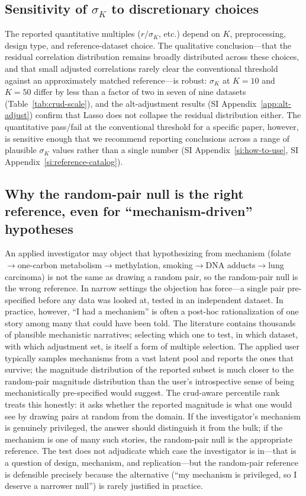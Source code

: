 \subsection{Sensitivity of \texorpdfstring{$\sigma_K$}{sigma\_K} to discretionary choices}
\label{si:sigma-K-sensitivity}

The reported quantitative multiples ($r/\sigma_K$, etc.) depend on $K$, preprocessing, design type, and reference-dataset choice. The qualitative conclusion---that the residual correlation distribution remains broadly distributed across these choices, and that small adjusted correlations rarely clear the conventional threshold against an approximately matched reference---is robust: $\sigma_K$ at $K=10$ and $K=50$ differ by less than a factor of two in seven of nine datasets (Table~\ref{tab:crud-scale}), and the alt-adjustment results (SI Appendix~\ref{app:alt-adjust}) confirm that Lasso does not collapse the residual distribution either. The quantitative pass/fail at the conventional threshold for a specific paper, however, is sensitive enough that we recommend reporting conclusions across a range of plausible $\sigma_K$ values rather than a single number (SI Appendix~\ref{si:how-to-use}, SI Appendix~\ref{si:reference-catalog}).

\subsection{Why the random-pair null is the right reference, even for ``mechanism-driven'' hypotheses}
\label{si:random-pair-null}

An applied investigator may object that hypothesizing from mechanism (folate$\to$one-carbon metabolism$\to$methylation, smoking$\to$DNA adducts$\to$lung carcinoma) is not the same as drawing a random pair, so the random-pair null is the wrong reference. In narrow settings the objection has force---a single pair pre-specified before any data was looked at, tested in an independent dataset. In practice, however, ``I had a mechanism'' is often a post-hoc rationalization of one story among many that could have been told. The literature contains thousands of plausible mechanistic narratives; selecting which one to test, in which dataset, with which adjustment set, is itself a form of multiple selection. The applied user typically samples mechanisms from a vast latent pool and reports the ones that survive; the magnitude distribution of the reported subset is much closer to the random-pair magnitude distribution than the user's introspective sense of being mechanistically pre-specified would suggest. The crud-aware percentile rank treats this honestly: it asks whether the reported magnitude is what one would see by drawing pairs at random from the domain. If the investigator's mechanism is genuinely privileged, the answer should distinguish it from the bulk; if the mechanism is one of many such stories, the random-pair null is the appropriate reference. The test does not adjudicate which case the investigator is in---that is a question of design, mechanism, and replication---but the random-pair reference is defensible precisely because the alternative (``my mechanism is privileged, so I deserve a narrower null'') is rarely justified in practice.

